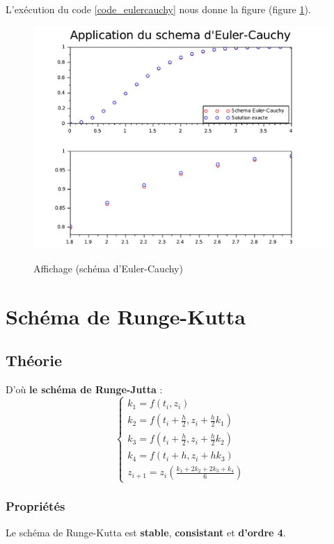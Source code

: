 \documentclass[a4paper,10pt]{report}
\begin{document}
L'exécution du code \ref{code_eulercauchy} nous donne la figure (figure \ref{graph_euler_cauchy}).
\begin{figure}[H]
\centering
\caption{Affichage (schéma d'Euler-Cauchy)}
\includegraphics[width=\textwidth]{euler_cauchy.pdf}
\label{graph_euler_cauchy}
\end{figure}

\section{Schéma de Runge-Kutta}
\subsection{Théorie}
D'où \textbf{le schéma de Runge-Jutta} :\\
\begin{equation}
\left\lbrace
\begin{array}{l}
k_1=f(t_i,z_i)\\
k_2=f \left( t_i + \frac{h}{2}, z_i+ \frac{h}{2}k_1 \right) \\
k_3=f \left( t_i + \frac{h}{2}, z_i+ \frac{h}{2}k_2 \right) \\
k_4=f \left( t_i + h, z_i+ hk_3 \right) \\
z_{i+1}=z_i\left( \frac{k_1+2k_2+2k_3+k_4}{6} \right)
\end{array}\right.
\end{equation}

\subsubsection{Propriétés}
Le schéma de Runge-Kutta est \textbf{stable}, \textbf{consistant} et \textbf{d'ordre 4}.
\end{document}
